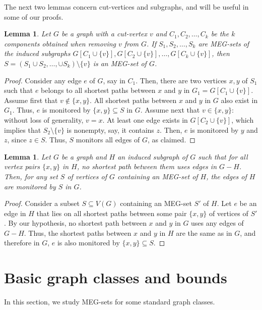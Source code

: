 \documentclass[10pt,a4paper]{article}
\newtheorem{lemma}[theorem]{Lemma}
\begin{document}
The next two lemmas concern cut-vertices and subgraphs, and will be useful in some of our proofs.

\begin{lemma}\label{cutv}
Let $G$ be a graph with a cut-vertex $v$ and $C_1,C_2,\ldots,C_k$ be the $k$ components obtained when removing $v$ from $G$. If $S_1, S_2,\ldots, S_k$ are MEG-sets of the induced subgraphs $G[C_1 \cup \{v\}], G[C_2 \cup \{v\}],\ldots,G[C_k \cup \{v\}]$, then $S = (S_1\cup S_2,\ldots,\cup S_k)\setminus\{v\}$ is an MEG-set of $G$.
\end{lemma}
\begin{proof}
Consider any edge $e$ of $G$, say in $C_1$. Then, there are two vertices $x,y$ of $S_1$ such that $e$ belongs to all shortest paths between $x$ and $y$ in $G_1=G[C_1\cup\{v\}]$. Assume first that $v\notin\{x,y\}$. All shortest paths between $x$ and $y$ in $G$ also exist in $G_1$. Thus, $e$ is monitored by $\{x,y\}\subseteq S$ in $G$. Assume next that $v \in\{x,y\}$: without loss of generality, $v = x$. At least one edge exists in $G[C_2 \cup \{v\}]$, which implies that $S_2\setminus\{v\}$ is nonempty, say, it contains $z$. Then, $e$ is monitored by $y$ and $z$, since $z\in S$. Thus, $S$ monitors all edges of $G$, as claimed.
\end{proof}


\begin{lemma}\label{subgr}
Let $G$ be a graph and $H$ an induced subgraph of $G$ such that for all vertex pairs $\{x, y\}$ in  $H$, no shortest path between them uses edges in $G-H$. Then, for any set $S$ of vertices of $G$ containing an MEG-set of $H$, the edges of $H$ are monitored by $S$ in $G$. 
\end{lemma}
\begin{proof}
Consider a subset $S \subseteq V(G)$ containing an MEG-set $S'$ of $H$. Let $e$ be an edge in $H$ that lies on all shortest paths between some pair $\{x,y\}$ of vertices of $S'$. By our hypothesis, no shortest path between $x$ and $y$ in $G$ uses any edges of $G-H$. Thus, the shortest paths between $x$ and $y$ in $H$ are the same as in $G$, and therefore in $G$, $e$ is also monitored by $\{x,y\}\subseteq S$.
\end{proof}

\section{Basic graph classes and bounds}\label{sec:classes}
In this section, we study MEG-sets for some standard graph classes.
\end{document}
